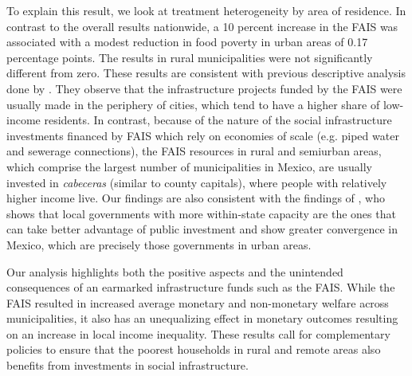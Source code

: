 \documentclass[dv_diss_main.tex]{subfiles}
\begin{document}
To explain this result, we look at treatment heterogeneity by area of residence. In contrast to the overall results nationwide, a 10 percent increase in the FAIS was associated with a modest reduction in food poverty in urban areas of 0.17 percentage points. The results in rural municipalities were not significantly different from zero. These results are consistent with previous descriptive analysis done by \cite{wellenstein2006social}. They observe that the infrastructure projects funded by the FAIS were usually made in the periphery of cities, which tend to have a higher share of low-income residents. In contrast, because of the nature of the social infrastructure investments financed by FAIS which rely on economies of scale (e.g. piped water  and sewerage connections), the FAIS resources in rural and semiurban areas, which comprise the largest number of municipalities in Mexico, are usually invested in \textit{cabeceras} (similar to county capitals), where people with relatively higher income live. Our findings are also consistent with the findings of \cite{smith2018aumento}, who shows that local governments with more within-state capacity are the ones that can take better advantage of public investment and show greater convergence in Mexico, which are precisely those governments in urban areas.

Our analysis highlights both the positive aspects and the unintended consequences of an earmarked infrastructure funds such as the FAIS. While the FAIS resulted in increased average monetary and non-monetary welfare across municipalities, it also has an unequalizing effect in monetary outcomes resulting on an increase in local income inequality. These results call for complementary policies to ensure that the poorest households in rural and remote areas also benefits from investments in social infrastructure.

\begin{comment}

\textbf{Related literature1.---} This paper contributes to several strands of the literature. On the discussion about the type of resources and public service delivery. We show the limits of earmarked transfers. 
Need to build a section that compares our estimates .... Martinez-COL and Litschig-BRA , other in Africa and other in Asia

In a similar paper on Brazil, \cite{litschig2013impact} find that intergovernmental transfers had a positive effect in schooling and literacy rates, as well as on lower poverty rates.

*Come back to education outcomes and may be mortality rates

\textbf{Related literature2.---}
On the impact of transfer multipliers/ better poverty!!!!!. We find very little household per-capita income increasing, 

Look other studies besides Litschig-BRA, RAvi !!!!!
i not it is still open the idea  of looking at income 

\textbf{Related literature3.---}
On the literature that focus on decentralization and state capture of local public goods. We shows how private gains can be concentrated 
What can be said here???

\end{comment}
\end{document}
